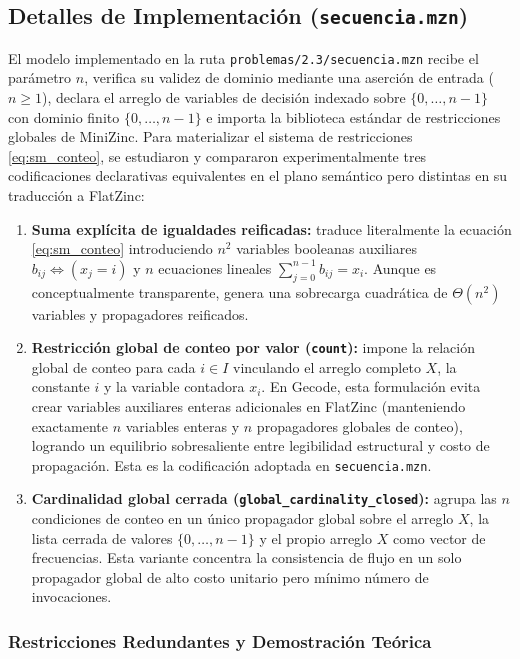 \subsection{Detalles de Implementación (\texttt{secuencia.mzn})}

El modelo implementado en la ruta \texttt{problemas/2.3/secuencia.mzn} recibe el parámetro $n$, verifica su validez de dominio mediante una aserción de entrada ($n \ge 1$), declara el arreglo de variables de decisión indexado sobre $\{0, \dots, n-1\}$ con dominio finito $\{0, \dots, n-1\}$ e importa la biblioteca estándar de restricciones globales de MiniZinc. Para materializar el sistema de restricciones \eqref{eq:sm_conteo}, se estudiaron y compararon experimentalmente tres codificaciones declarativas equivalentes en el plano semántico pero distintas en su traducción a FlatZinc:
\begin{enumerate}
    \item \textbf{Suma explícita de igualdades reificadas:} traduce literalmente la ecuación \eqref{eq:sm_conteo} introduciendo $n^2$ variables booleanas auxiliares $b_{ij} \iff (x_j = i)$ y $n$ ecuaciones lineales $\sum_{j=0}^{n-1} b_{ij} = x_i$. Aunque es conceptualmente transparente, genera una sobrecarga cuadrática de $\Theta(n^2)$ variables y propagadores reificados.
    \item \textbf{Restricción global de conteo por valor (\texttt{count}):} impone la relación global de conteo para cada $i \in I$ vinculando el arreglo completo $X$, la constante $i$ y la variable contadora $x_i$. En Gecode, esta formulación evita crear variables auxiliares enteras adicionales en FlatZinc (manteniendo exactamente $n$ variables enteras y $n$ propagadores globales de conteo), logrando un equilibrio sobresaliente entre legibilidad estructural y costo de propagación. Esta es la codificación adoptada en \texttt{secuencia.mzn}.
    \item \textbf{Cardinalidad global cerrada (\texttt{global\_cardinality\_closed}):} agrupa las $n$ condiciones de conteo en un único propagador global sobre el arreglo $X$, la lista cerrada de valores $\{0, \dots, n-1\}$ y el propio arreglo $X$ como vector de frecuencias. Esta variante concentra la consistencia de flujo en un solo propagador global de alto costo unitario pero mínimo número de invocaciones.
\end{enumerate}

\subsubsection{Restricciones Redundantes y Demostración Teórica}

